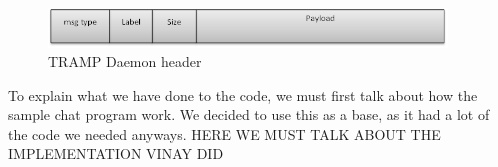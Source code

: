 \begin{figure}[ht!]
\centering
 \includegraphics[width=300pt]{tramp_pkt.png}
\caption{TRAMP Daemon header}
\end{figure}

To explain what we have done to the code, we must first talk about how the sample chat program work. We decided to use this as a base, as it had a lot of the code we needed anyways. HERE WE MUST TALK ABOUT THE IMPLEMENTATION VINAY DID



